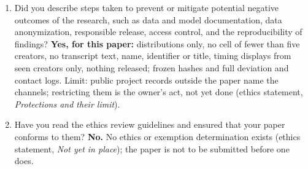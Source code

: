 {\begin{enumerate}
\begin{enumerate}
\item Did you describe steps taken to prevent or mitigate potential negative outcomes of the research, such as data and model documentation, data anonymization, responsible release, access control, and the reproducibility of findings? \textbf{Yes, for this paper:} distributions only, no cell of fewer than five creators, no transcript text, name, identifier or title, timing displays from seen creators only, nothing released; frozen hashes and full deviation and contact logs. Limit: public project records outside the paper name the channels; restricting them is the owner's act, not yet done (ethics statement, \emph{Protections and their limit}).
\item Have you read the ethics review guidelines and ensured that your paper conforms to them? \textbf{No.} No ethics or exemption determination exists (ethics statement, \emph{Not yet in place}); the paper is not to be submitted before one does.
\end{enumerate}


\end{enumerate}}
